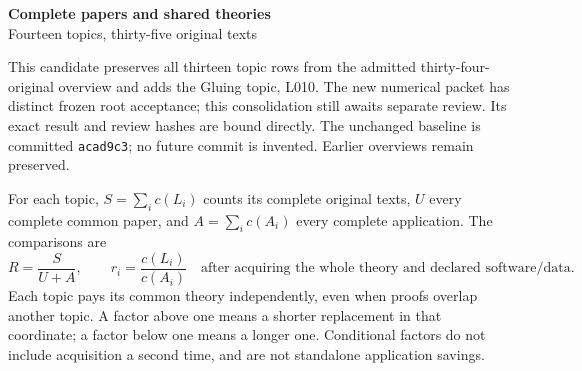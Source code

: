 \documentclass[11pt,a4paper]{article}
\begin{document}
\begin{center}\Large\textbf{Complete papers and shared theories}\\[4pt]
\normalsize Fourteen topics, thirty-five original texts\end{center}
This candidate preserves all thirteen topic rows from the admitted thirty-four-original overview and adds the Gluing topic, L010. The new numerical packet has distinct frozen root acceptance; this consolidation still awaits separate review. Its exact result and review hashes are bound directly. The unchanged baseline is committed \texttt{acad9c3}; no future commit is invented. Earlier overviews remain preserved.

For each topic, $S=\sum_i c(L_i)$ counts its complete original texts, $U$ every complete common paper, and $A=\sum_i c(A_i)$ every complete application. The comparisons are
\[
 R=\frac{S}{U+A},\qquad r_i=\frac{c(L_i)}{c(A_i)}
 \quad\text{after acquiring the whole theory and declared software/data.}
\]
Each topic pays its common theory independently, even when proofs overlap another topic. A factor above one means a shorter replacement in that coordinate; a factor below one means a longer one. Conditional factors do not include acquisition a second time, and are not standalone application savings.
\end{document}
